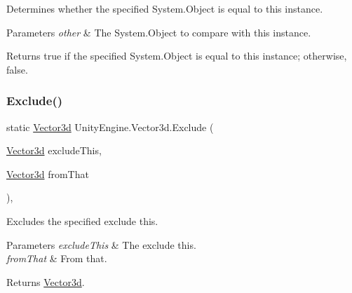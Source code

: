 Determines whether the specified System.\+Object is equal to this instance. 


\begin{DoxyParams}{Parameters}
{\em other} & The System.\+Object to compare with this instance.\\
\hline
\end{DoxyParams}
\begin{DoxyReturn}{Returns}
{\ttfamily true} if the specified System.\+Object is equal to this instance; otherwise, {\ttfamily false}.
\end{DoxyReturn}
\mbox{\label{struct_unity_engine_1_1_vector3d_a263b1eb55f5d6532b12a626bc3d71de2}} 
\subsubsection{\texorpdfstring{Exclude()}{Exclude()}}
{\footnotesize\ttfamily static \hyperlink{struct_unity_engine_1_1_vector3d}{Vector3d} Unity\+Engine.\+Vector3d.\+Exclude (\begin{DoxyParamCaption}\item[{\hyperlink{struct_unity_engine_1_1_vector3d}{Vector3d}}]{exclude\+This,  }\item[{\hyperlink{struct_unity_engine_1_1_vector3d}{Vector3d}}]{from\+That }\end{DoxyParamCaption})\hspace{0.3cm}{\ttfamily [inline]}, {\ttfamily [static]}}



Excludes the specified exclude this. 


\begin{DoxyParams}{Parameters}
{\em exclude\+This} & The exclude this.\\
\hline
{\em from\+That} & From that.\\
\hline
\end{DoxyParams}
\begin{DoxyReturn}{Returns}
\hyperlink{struct_unity_engine_1_1_vector3d}{Vector3d}.
\end{DoxyReturn}
\mbox{\label{struct_unity_engine_1_1_vector3d_acb727809084d322580684c8eb24acab7}} 
